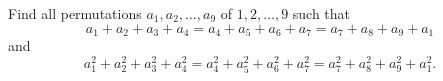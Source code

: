 Find all permutations $a_1, a_2, \ldots, a_9$ of $1, 2, \ldots, 9$ such that
\[ a_1+a_2+a_3+a_4=a_4+a_5+a_6+a_7= a_7+a_8+a_9+a_1 \]
and
\[ a_1^2+a_2^2+a_3^2+a_4^2=a_4^2+a_5^2+a_6^2+a_7^2= a_7^2+a_8^2+a_9^2+a_1^2.\]
